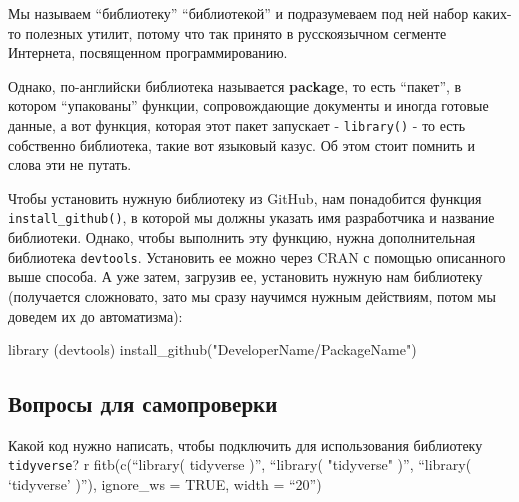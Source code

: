 \documentclass[
  letterpaper,
  DIV=11,
  numbers=noendperiod]{scrreprt}
\newenvironment{Shaded}{\begin{snugshade}}{\end{snugshade}}
\newcommand{\FunctionTok}[1]{\textcolor[rgb]{0.28,0.35,0.67}{#1}}
\newcommand{\NormalTok}[1]{\textcolor[rgb]{0.00,0.23,0.31}{#1}}
\newcommand{\StringTok}[1]{\textcolor[rgb]{0.13,0.47,0.30}{#1}}
\begin{document}
Мы называем ``библиотеку'' ``библиотекой'' и подразумеваем под ней набор
каких-то полезных утилит, потому что так принято в русскоязычном
сегменте Интернета, посвященном программированию.

Однако, по-английски библиотека называется \textbf{package}, то есть
``пакет'', в котором ``упакованы'' функции, сопровождающие документы и
иногда готовые данные, а вот функция, которая этот пакет запускает -
\texttt{library()} - то есть собственно библиотека, такие вот языковый
казус. Об этом стоит помнить и слова эти не путать.

Чтобы установить нужную библиотеку из GitHub, нам понадобится функция
\texttt{install\_github()}, в которой мы должны указать имя разработчика
и название библиотеки. Однако, чтобы выполнить эту функцию, нужна
дополнительная библиотека \texttt{devtools}. Установить ее можно через
CRAN с помощью описанного выше способа. А уже затем, загрузив ее,
установить нужную нам библиотеку (получается сложновато, зато мы сразу
научимся нужным действиям, потом мы доведем их до автоматизма):

\begin{Shaded}
\begin{Highlighting}[]
\FunctionTok{library}\NormalTok{ (devtools)}
\FunctionTok{install\_github}\NormalTok{(}\StringTok{"DeveloperName/PackageName"}\NormalTok{)}
\end{Highlighting}
\end{Shaded}

\hypertarget{ux432ux43eux43fux440ux43eux441ux44b-ux434ux43bux44f-ux441ux430ux43cux43eux43fux440ux43eux432ux435ux440ux43aux438-1}{%
\subsection{Вопросы для
самопроверки}\label{ux432ux43eux43fux440ux43eux441ux44b-ux434ux43bux44f-ux441ux430ux43cux43eux43fux440ux43eux432ux435ux440ux43aux438-1}}

Какой код нужно написать, чтобы подключить для использования библиотеку
\texttt{tidyverse}? r fitb(c(``library( tidyverse )'', ``library(
"tidyverse" )'', ``library( `tidyverse' )''), ignore\_ws = TRUE, width =
``20'')
\end{document}
